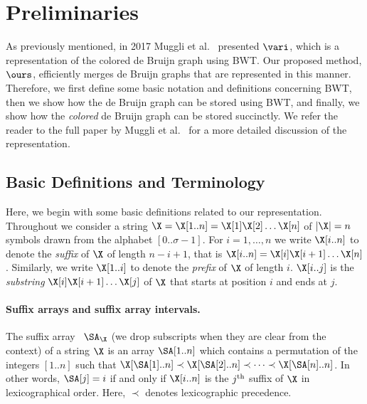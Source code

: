\section*{Preliminaries} \label{prel:vari}

As previously mentioned, in 2017 Muggli et al.~\cite{vari} presented $\vari$, which is a representation of the colored de Bruijn graph using BWT.  Our proposed method, $\ours$, efficiently merges de Bruijn graphs that are represented in this manner. Therefore, we first define some basic notation and definitions concerning BWT, then we show how the de Bruijn graph can be stored using BWT, and finally, we show how the {\em colored} de Bruijn graph can be stored succinctly.  We refer the reader to the full paper by Muggli et al.~\cite{vari} for a more detailed discussion of the representation.   

\subsection*{Basic Definitions and Terminology} %

Here, we begin with some basic definitions related to our representation.  Throughout we consider a string $\X = \X[1..n] = \X[1]\X[2]\ldots
\X[n]$ of $|\X| = n$ symbols drawn from the alphabet $[0..\sigma-1]$.
For $i=1,\ldots,n$ we
write $\X[i..n]$ to denote the {\em suffix} of $\X$ of length $n-i+1$,
that is $\X[i..n] = \X[i]\X[i+1]\ldots \X[n]$.  
Similarly, we write
$\X[1..i]$ to denote the {\em prefix} of $\X$ of length $i$.
$\X[i..j]$ is the {\em substring} $\X[i]\X[i+1]\ldots \X[j]$ of $\X$
that starts at position $i$ and ends at $j$. 

\paragraph*{Suffix arrays and suffix array intervals.}
The suffix array~\cite{mm1993} $\SA_{\X}$ (we drop subscripts when
they are clear
from the context) of a string $\X$
is an array $\SA[1..n]$ which
contains a permutation of the integers $[1..n]$ such that $\X[\SA[1]..n]
\prec \X[\SA[2]..n] \prec \cdots \prec \X[\SA[n]..n]$.  In other words, $\SA[j] =
i$ if and only if $\X[i..n]$ is the $j^{\mbox{{\scriptsize th}}}$ suffix of $\X$
in lexicographical order. Here, $\prec$ denotes lexicographic precedence.

